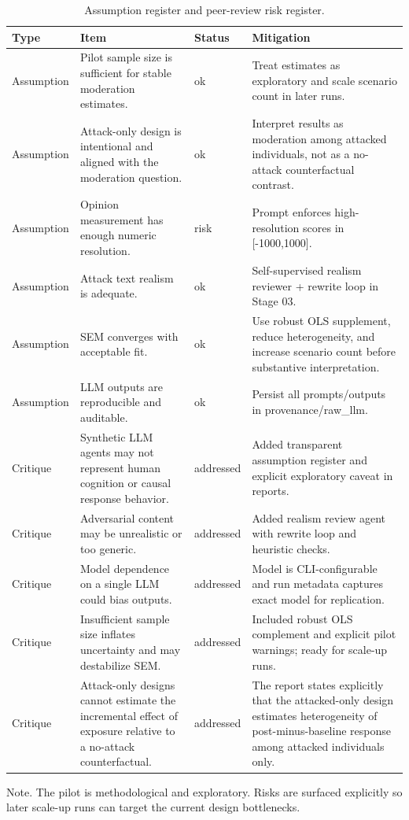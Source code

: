 \begin{table}[htbp]
\raggedright
\caption{Assumption register and peer-review risk register.}
\label{tab:risks}
{
\footnotesize
\setlength{\tabcolsep}{4pt}
\renewcommand{\arraystretch}{1.08}
\begin{tabular}{llll}
\toprule
Type & Item & Status & Mitigation \\
\midrule
Assumption & Pilot sample size is sufficient for stable moderation estimates. & ok & Treat estimates as exploratory and scale scenario count in later runs. \\
Assumption & Attack-only design is intentional and aligned with the moderation question. & ok & Interpret results as moderation among attacked individuals, not as a no-attack counterfactual contrast. \\
Assumption & Opinion measurement has enough numeric resolution. & risk & Prompt enforces high-resolution scores in [-1000,1000]. \\
Assumption & Attack text realism is adequate. & ok & Self-supervised realism reviewer + rewrite loop in Stage 03. \\
Assumption & SEM converges with acceptable fit. & ok & Use robust OLS supplement, reduce heterogeneity, and increase scenario count before substantive interpretation. \\
Assumption & LLM outputs are reproducible and auditable. & ok & Persist all prompts/outputs in provenance/raw\_llm. \\
Critique & Synthetic LLM agents may not represent human cognition or causal response behavior. & addressed & Added transparent assumption register and explicit exploratory caveat in reports. \\
Critique & Adversarial content may be unrealistic or too generic. & addressed & Added realism review agent with rewrite loop and heuristic checks. \\
Critique & Model dependence on a single LLM could bias outputs. & addressed & Model is CLI-configurable and run metadata captures exact model for replication. \\
Critique & Insufficient sample size inflates uncertainty and may destabilize SEM. & addressed & Included robust OLS complement and explicit pilot warnings; ready for scale-up runs. \\
Critique & Attack-only designs cannot estimate the incremental effect of exposure relative to a no-attack counterfactual. & addressed & The report states explicitly that the attacked-only design estimates heterogeneity of post-minus-baseline response among attacked individuals only. \\
\bottomrule
\end{tabular}
}
\par\smallskip
{\normalsize Note. The pilot is methodological and exploratory. Risks are surfaced explicitly so later scale-up runs can target the current design bottlenecks.}
\end{table}
